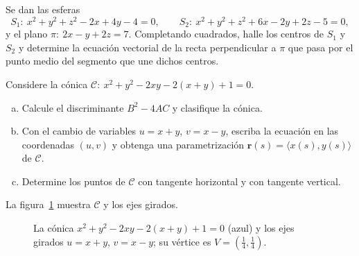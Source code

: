 \begin{prob}
Se dan las esferas
\[
  S_1:\ x^2+y^2+z^2-2x+4y-4=0,\qquad
  S_2:\ x^2+y^2+z^2+6x-2y+2z-5=0,
\]
y el plano $\pi:\ 2x-y+2z=7$. Completando cuadrados, halle los centros de
$S_1$ y $S_2$ y determine la ecuación vectorial de la recta perpendicular a
$\pi$ que pasa por el punto medio del segmento que une dichos centros.
\end{prob}

\begin{prob}
Considere la cónica $\mathcal{C}:\ x^2+y^2-2xy-2(x+y)+1=0$.
\begin{enumerate}[a)]
  \item Calcule el discriminante $B^2-4AC$ y clasifique la cónica.
  \item Con el cambio de variables $u=x+y$, $v=x-y$, escriba la ecuación en
        las coordenadas $(u,v)$ y obtenga una parametrización
        $\mathbf{r}(s)=\langle x(s),y(s)\rangle$ de $\mathcal{C}$.
  \item Determine los puntos de $\mathcal{C}$ con tangente horizontal y con
        tangente vertical.
\end{enumerate}
La figura~\ref{fig:parabola_rotada} muestra $\mathcal{C}$ y los ejes girados.
\end{prob}

\begin{figure}[!htbp]
\centering
{}
\caption{La cónica $x^2+y^2-2xy-2(x+y)+1=0$ (azul) y los ejes girados
  $u=x+y$, $v=x-y$; su vértice es $V=\left(\tfrac14,\tfrac14\right)$.}
\label{fig:parabola_rotada}
\end{figure}

